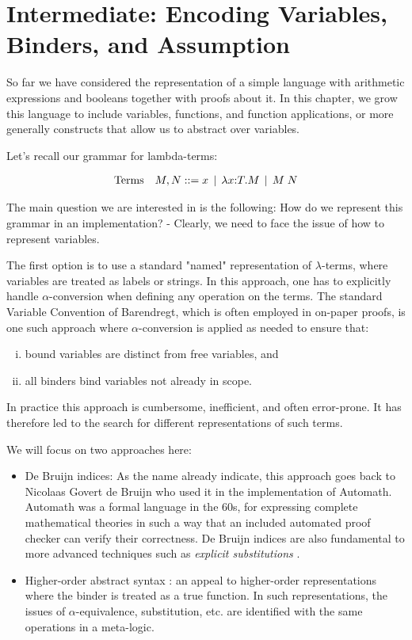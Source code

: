 \chapter{Intermediate: Encoding Variables, Binders, and Assumption}
So far we have considered the representation of a simple language with
arithmetic expressions and booleans together with proofs about it. In this
chapter, we grow this language to include variables, functions, and function applications,
or more generally constructs that allow us to abstract over variables.

Let's recall our grammar for lambda-terms:

\[
\begin{array}{ll@{\bnfas}l}
\mbox{Terms} & M, N & x \bnfalt \lam x{:}T.M \bnfalt M \app N
\end{array}
\]

The main question we are interested in is the following: How do we
represent this grammar in an implementation? - Clearly, we need to
face the issue of how to represent variables.

The first option is to use a standard "named" representation of
$\lambda$-terms, where variables are treated as labels or strings. In
this approach, one has to explicitly handle $\alpha$-conversion when
defining any operation on the terms. The standard Variable Convention
of Barendregt, which is often employed in on-paper proofs, is one such
approach where $\alpha$-conversion is applied as needed to ensure
that:

\begin{enumerate}[(i)]
\item bound variables are distinct from free variables, and
\item all binders bind variables not already in scope.
\end{enumerate}

In practice this approach is cumbersome, inefficient, and often error-prone. It
has therefore led to the search for different representations of such terms.

We will focus on two approaches here:

\begin{itemize}
\item De Bruijn indices: As the name already indicate, this approach
  goes back to Nicolaas Govert de Bruijn who used it in the
  implementation of Automath. Automath was a formal language in the
  60s, for expressing complete mathematical theories in such a way
  that an included automated proof checker can verify their
  correctness. De Bruijn indices are also fundamental to more advanced
  techniques such as \emph{explicit substitutions}
  \cite{Abadi:POPL90}.

\item Higher-order abstract syntax \cite{Pfenning88pldi}: an appeal to
  higher-order representations where the binder is treated as a true
  function. In such representations, the issues of
  $\alpha$-equivalence, substitution, etc. are identified with the
  same operations in a meta-logic.
\end{itemize}

